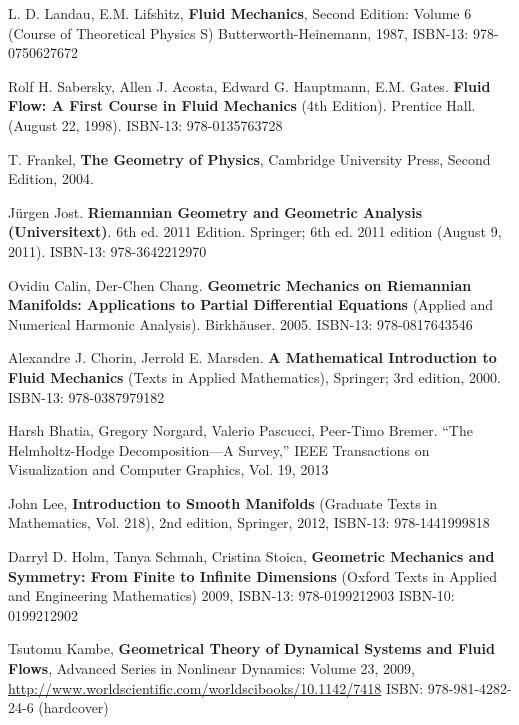 \documentclass[twoside,landscape,10pt]{amsart}
\theoremstyle{plain}
\theoremstyle{definition}
\theoremstyle{remark}
\theoremstyle{remark}
\begin{document}
\begin{thebibliography}{9}

L. D. Landau, E.M. Lifshitz, \textbf{Fluid Mechanics}, Second Edition: Volume 6 (Course of Theoretical Physics S) Butterworth-Heinemann, 1987, ISBN-13: 978-0750627672

Rolf H. Sabersky, Allen J. Acosta, Edward G. Hauptmann, E.M. Gates.  \textbf{Fluid Flow: A First Course in Fluid Mechanics} (4th Edition).  Prentice Hall. (August 22, 1998).  ISBN-13: 978-0135763728

T. Frankel,
\textbf{The Geometry of Physics}, 
Cambridge University Press, 
Second Edition,
2004.

J\"{u}rgen Jost. \textbf{Riemannian Geometry and Geometric Analysis (Universitext)}. 6th ed. 2011 Edition.  Springer; 6th ed. 2011 edition (August 9, 2011).  ISBN-13: 978-3642212970


Ovidiu Calin, Der-Chen Chang. \textbf{Geometric Mechanics on Riemannian Manifolds: Applications to Partial Differential Equations} (Applied and Numerical Harmonic Analysis).  Birkh\"{a}user. 2005. ISBN-13: 978-0817643546







Alexandre J. Chorin, Jerrold E. Marsden. \textbf{A Mathematical Introduction to Fluid Mechanics} (Texts in Applied Mathematics), Springer; 3rd edition, 2000. ISBN-13: 978-0387979182


Harsh Bhatia, Gregory Norgard, Valerio Pascucci, Peer-Timo Bremer. ``The Helmholtz-Hodge Decomposition—A Survey,'' IEEE Transactions on Visualization and Computer Graphics, Vol. 19,  2013


John Lee, \textbf{Introduction to Smooth Manifolds} (Graduate Texts in Mathematics, Vol. 218), 2nd edition, Springer,  2012, ISBN-13: 978-1441999818


Darryl D. Holm, Tanya Schmah, Cristina Stoica, \textbf{Geometric Mechanics and Symmetry: From Finite to Infinite Dimensions} (Oxford Texts in Applied and Engineering Mathematics) 2009,  ISBN-13: 978-0199212903  ISBN-10: 0199212902  

Tsutomu Kambe, \textbf{Geometrical Theory of Dynamical Systems and Fluid Flows}, Advanced Series in Nonlinear Dynamics: Volume 23, 2009, \url{http://www.worldscientific.com/worldscibooks/10.1142/7418} ISBN: 978-981-4282-24-6 (hardcover)



\end{thebibliography}
\end{document}
